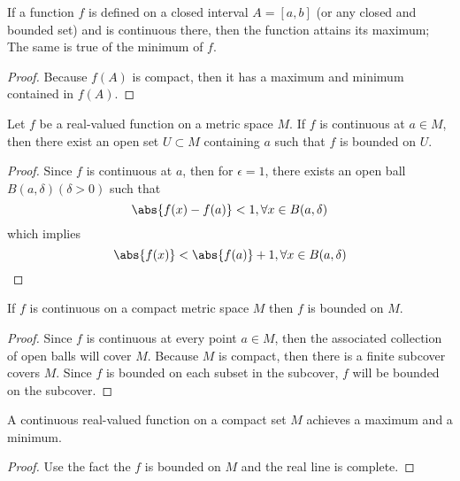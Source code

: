 \begin{refsection}
\begin{theorem}
	\cite[114]{johnsonbaugh2010foundations}\cite[130]{abbott2001understanding}\label{ch:calculus:th:extremevaluetheoremfunctiononclosedinterval}
	If a function $f$ is defined on a closed interval $A=[a,b]$ (or any closed and bounded set) and is continuous there, then the function attains its maximum; The same is true of the minimum of $f$.
\end{theorem}
\begin{proof}
	Because $f(A)$ is compact, then it has a maximum and minimum contained in $f(A)$.	
\end{proof}


\begin{lemma}
	\cite[146]{johnsonbaugh2010foundations} Let $f$ be a real-valued function on a metric space $M$. If $f$ is continuous at $a\in M$, then there exist an open set $U\subset M$ containing $a$ such that $f$ is bounded on $U$.
\end{lemma}
\begin{proof}
	Since $f$ is continuous at $a$, then for $\epsilon = 1$, there exists an open ball $B(a,\delta)(\delta > 0)$ such that 
	$$\abs{f(x) - f(a)} < 1,\forall x \in B(a,\delta)$$
	which implies 
	$$\abs{f(x)} < \abs{f(a)} + 1,\forall x \in B(a,\delta)$$
\end{proof}


\begin{theorem}
	\cite[146]{johnsonbaugh2010foundations} If $f$ is continuous on a compact metric space $M$ then $f$ is bounded on $M$.
\end{theorem}
\begin{proof}
	Since $f$ is continuous at every point $a\in M$, then the associated collection of open balls will cover $M$. Because $M$ is compact, then there is a finite subcover covers $M$. Since $f$ is bounded on each subset in the subcover, $f$ will be bounded on the subcover.
\end{proof}


\begin{corollary}
	\cite[146]{johnsonbaugh2010foundations}
	A continuous real-valued function on a compact set $M$ achieves a maximum and a minimum.
\end{corollary}
\begin{proof}
	Use the fact the $f$ is bounded on $M$ and the real line is complete.
\end{proof}



\end{refsection}
